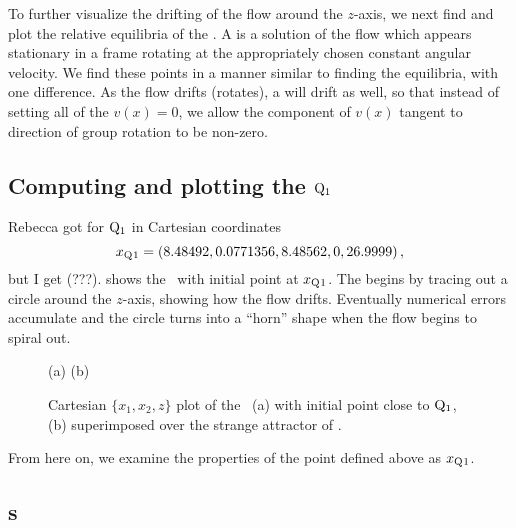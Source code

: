 {To further visualize the drifting of the flow around the
$z$-axis, we next find and plot the relative equilibria of
the \cLe. A {\reqv} is a solution of the flow which appears
stationary in a frame rotating at the appropriately chosen
constant angular velocity. We find these points in a manner
similar to finding the equilibria, with one difference. As
the flow drifts (rotates), a {\reqv} will drift as well, so
that instead of setting all of the $v(x)=0$, we allow the
component of $v(x)$ tangent to direction of group rotation to
be non-zero.

\subsection{Computing and plotting the {\reqv} $\mathrm{Q}_{1}$}


Rebecca got for
$\mathrm{Q}_{1}$ in Cartesian coordinates
\[x_{\mathrm{Q}_{}1} = (8.48492,0.0771356,8.48562,0,26.9999)
\,,
\]
but I get (???).
 shows the \cLf\ with initial point at
$x_{\mathrm{Q}_{}1}$. The {\reqv} begins by tracing out a circle
around the $z$-axis, showing how the flow drifts. Eventually
numerical errors accumulate and the circle turns into a
``horn'' shape when the flow begins to spiral out.
\begin{figure}[h]
\begin{center}
(a) %
(b) %
\end{center}
\caption{
Cartesian $\{x_1,x_2,z\}$ plot of the \cLf\ (a) with initial point
close to $\mathrm{Q}_{1}$, (b) superimposed over the strange attractor of
.
    }
\label{fig:CLERelEqui}
\end{figure}

From
here on, we examine the properties of the point defined
above as $x_{\mathrm{Q}_{}1}$.

\subsection{\Rpo s}
\label{SF:rpos}

}
